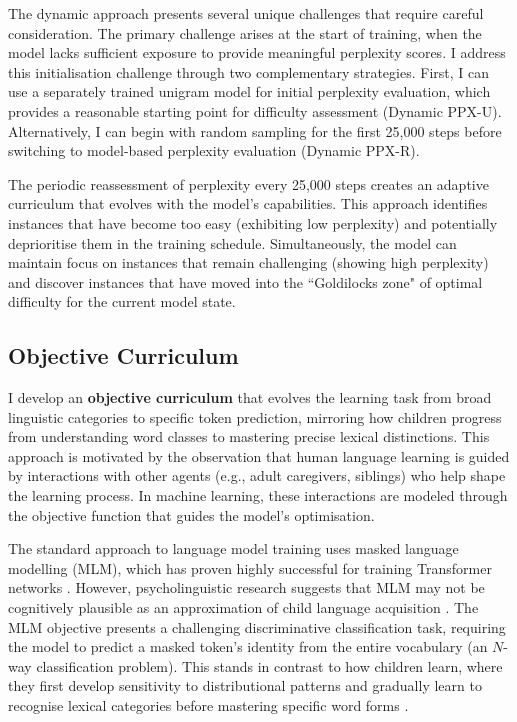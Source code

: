 \begin{enumerate}
The dynamic approach presents several unique challenges that require careful consideration. The primary challenge arises at the start of training, when the model lacks sufficient exposure to provide meaningful perplexity scores. I address this initialisation challenge through two complementary strategies. First, I can use a separately trained unigram model for initial perplexity evaluation, which provides a reasonable starting point for difficulty assessment (Dynamic PPX-U). Alternatively, I can begin with random sampling for the first 25,000 steps before switching to model-based perplexity evaluation (Dynamic PPX-R).

The periodic reassessment of perplexity every 25,000 steps creates an adaptive curriculum that evolves with the model's capabilities. This approach identifies instances that have become too easy (exhibiting low perplexity) and potentially deprioritise them in the training schedule. Simultaneously, the model can maintain focus on instances that remain challenging (showing high perplexity) and discover instances that have moved into the ``Goldilocks zone" of optimal difficulty for the current model state.

\end{enumerate}

\subsection{Objective Curriculum}
\label{subsec:objective-cl}

I develop an \textbf{objective curriculum} that evolves the learning task from broad linguistic categories to specific token prediction, mirroring how children progress from understanding word classes to mastering precise lexical distinctions. This approach is motivated by the observation that human language learning is guided by interactions with other agents (e.g., adult caregivers, siblings) who help shape the learning process. In machine learning, these interactions are modeled through the objective function that guides the model's optimisation.

The standard approach to language model training uses masked language modelling (MLM), which has proven highly successful for training Transformer networks \citep{devlin2019bert}. However, psycholinguistic research suggests that MLM may not be cognitively plausible as an approximation of child language acquisition \citep{caucheteux2023evidence}. The MLM objective presents a challenging discriminative classification task, requiring the model to predict a masked token's identity from the entire vocabulary (an $N$-way classification problem). This stands in contrast to how children learn, where they first develop sensitivity to distributional patterns and gradually learn to recognise lexical categories before mastering specific word forms \citep{alishahi2010computational, gleitman1990structural}.

